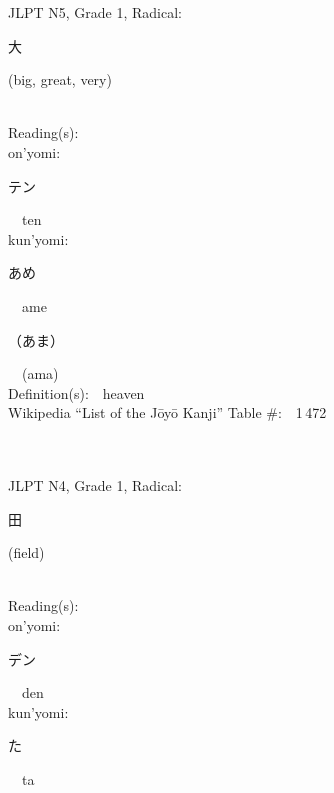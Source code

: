\begin{multicols}{2}
{JLPT N5, Grade 1, Radical:\ \ {\begin{CJK}{UTF8}{min} 大 \end{CJK}} (big, great, very) } \\
Reading(s):\ \ \\
{\hspace*{1em}}on'yomi:\ \ \\
{\hspace*{2em}}{\begin{CJK}{UTF8}{min} テン \end{CJK}}\ \ ten\ \ \\
{\hspace*{1em}}kun'yomi:\ \ \\
{\hspace*{2em}}{\begin{CJK}{UTF8}{min} あめ \end{CJK}}\ \ ame\ \ \\
{\hspace*{2em}}{\begin{CJK}{UTF8}{min} （あま） \end{CJK}}\ \ (ama)\ \ \\
Definition(s):\ \ heaven \\
Wikipedia ``List of the J\=oy\=o Kanji'' Table \#:\ \ 1\,472 \\
\ \ \\
{\fontsize{34pt}{40pt}  }\ \ \\  %
{JLPT N4, Grade 1, Radical:\ \ {\begin{CJK}{UTF8}{min} 田 \end{CJK}} (field) } \\
Reading(s):\ \ \\
{\hspace*{1em}}on'yomi:\ \ \\
{\hspace*{2em}}{\begin{CJK}{UTF8}{min} デン \end{CJK}}\ \ den\ \ \\
{\hspace*{1em}}kun'yomi:\ \ \\
{\hspace*{2em}}{\begin{CJK}{UTF8}{min} た \end{CJK}}\ \ ta\ \ \\

\end{multicols}
